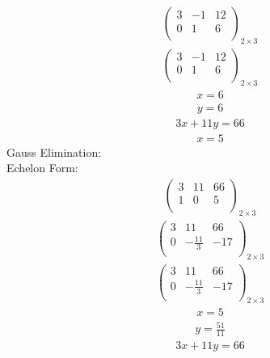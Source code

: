 \documentclass{article}
\begin{document}
\begin{align*}
\left(
\begin{array}{cc|c}
3 & -1 & 12\\
0 & 1 & 6\\
\end{array}
\right)_{2\times 3}
\end{align*}
\begin{align*}
\left(
\begin{array}{cc|c}
3 & -1 & 12\\
0 & 1 & 6\\
\end{array}
\right)_{2\times 3}
\end{align*}
\begin{align*}
x=6\end{align*}
\begin{align*}
y=6\end{align*}
\begin{align*}
3x + 11y=66\end{align*}
\begin{align*}
x=5\end{align*}
Gauss Elimination:\\
Echelon Form:\\
\begin{align*}
\left(
\begin{array}{cc|c}
3 & 11 & 66\\
1 & 0 & 5\\
\end{array}
\right)_{2\times 3}
\end{align*}
\begin{align*}
\left(
\begin{array}{cc|c}
3 & 11 & 66\\
0 & -\frac{11}{3} & -17\\
\end{array}
\right)_{2\times 3}
\end{align*}
\begin{align*}
\left(
\begin{array}{cc|c}
3 & 11 & 66\\
0 & -\frac{11}{3} & -17\\
\end{array}
\right)_{2\times 3}
\end{align*}
\begin{align*}
x=5\end{align*}
\begin{align*}
y=\frac{51}{11}\end{align*}
\begin{align*}
3x + 11y=66\end{align*}
\end{document}
